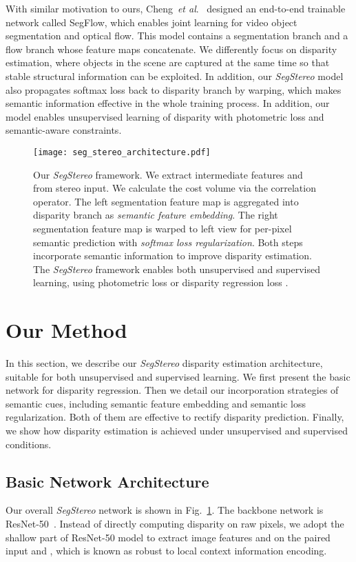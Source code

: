 \documentclass[runningheads]{llncs}
\newcommand{\etal}{\textit{et al}.}
\begin{document}
With similar motivation to ours, Cheng~\etal~\cite{cheng2017segflow} designed an end-to-end trainable network called {SegFlow}, which enables joint learning for video object segmentation and optical flow. This model contains a segmentation branch and a flow branch whose feature maps concatenate. We differently focus on disparity estimation, where objects in the scene are captured at the same time so that stable structural information can be exploited. In addition, our \emph{SegStereo} model also propagates softmax loss back to disparity branch by warping, which makes semantic information effective in the whole training process. In addition, our model enables unsupervised learning of disparity with photometric loss and semantic-aware constraints.

\begin{figure}[th]
  \centering
  \texttt{[image: seg\_stereo\_architecture.pdf]}
  \caption{Our \emph{SegStereo} framework. We extract intermediate features  and  from stereo input. We calculate the cost volume  via the correlation operator. The left segmentation feature map  is aggregated into disparity branch as \emph{semantic feature embedding}. The right segmentation feature map  is warped to left view for per-pixel semantic prediction with \emph{softmax loss regularization}. Both steps incorporate semantic information to improve disparity estimation. The \emph{SegStereo} framework enables both unsupervised and supervised learning, using photometric loss  or disparity regression loss .
  }
  \label{fig:segstereo}
\end{figure}

\section{Our Method}
In this section, we describe our \emph{SegStereo} disparity estimation architecture, suitable for both unsupervised and supervised learning. We first present the basic network for disparity regression. Then we detail our incorporation strategies of semantic cues, including semantic feature embedding and semantic loss regularization. Both of them are effective to rectify disparity prediction. Finally, we show how disparity estimation is achieved under unsupervised and supervised conditions.

\subsection{Basic Network Architecture}
Our overall \emph{SegStereo} network is shown in Fig.~\ref{fig:segstereo}. The backbone network is ResNet-50~\cite{he2016deep}. Instead of directly computing disparity on raw pixels, we adopt the shallow part of ResNet-50 model to extract image features  and  on the paired input  and , which is known as robust to local context information encoding. 
\end{document}
